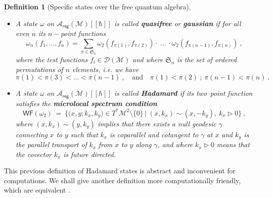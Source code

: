 \documentclass[11pt]{book}
\newcommand{\WF}{\mathsf{WF}}
\newcommand{\reg}{\mathsf{reg}}
\newcommand{\Acal}{\mathcal{A}}
\newcommand{\Dcal}{\mathcal{D}}
\newcommand{\Mcal}{\mathcal{M}}
\newcommand{\Srak}{\mathfrak{S}}
\theoremstyle{break}
\newtheorem{definition}{Definition}[chapter]
\begin{document}
\begin{definition}[Specific states over the free quantum algebra]
%
\begin{itemize}
\setlength\itemsep{0pt}
\item A state $\omega$ on $\Acal_\reg(\Mcal)[[\hbar]]$ is called \textbf{quasifree} or \textbf{gaussian} if for all even $n$ its $n-$point functions
%
\begin{equation*}
\omega_n\left(f_1,  \dots , f_n  \right) =  \sum_{\pi \in \Srak_n} \omega_2\left( f_{\pi(1)}, f_{\pi(2)} \right) \cdot \ \dots \ \cdot \omega_2\left( f_{\pi(n-1)}, f_{\pi(n)} \right) \ ,
\end{equation*}
%
where the test functions $f_i \in \Dcal(\Mcal)$ and where $\Srak_n$ is the set of ordered permutations of $n$ elements, i.e. we have 
%
\begin{equation*}
\pi(1) < \pi(3) < \dots < \pi(n-1) \ , \quad \mbox{and} \quad \pi(1) < \pi(2) \ ;  \ \pi(n-1) < \pi(n) \ . 
\end{equation*}
%
%
%
\item A state $\omega$ on $\Acal_\reg(\Mcal)[[\hbar]]$ is called \textbf{Hadamard} if its two--point function satisfies the \textbf{microlocal spectrum condition}
%
\begin{equation}
\WF(\omega_2) \ = \ \bigg\{ \bigg( x, y ; k_x, k_y \bigg) \in T^\ast\Mcal^2 \setminus \{0\} \ \bigg| \ (x,k_x) \sim (x,-k_y), \ k_x \triangleright 0 \bigg\} \ ,
\label{eq:microlocal_spectrum_condition}
\end{equation}
%
where $(x,k_x) \sim (y,k_y)$ implies that there exists a null geodesic $\gamma$ connecting $x$ to $y$ such that $k_x$ is coparallel and cotangent to $\gamma$ at $x$ and $k_y$ is the parallel transport of $k_x$ from $x$ to $y$ along $\gamma$, and where $k_x \triangleright 0$ means that the covector $k_x$ is future directed.
\end{itemize}
\end{definition}


This previous definition of Hadamard states is abstract and inconvenient for computations. We shall give another definition more computationally friendly, which are equivalent \cite{RADZIKOWSKI_1996}.
\end{document}
